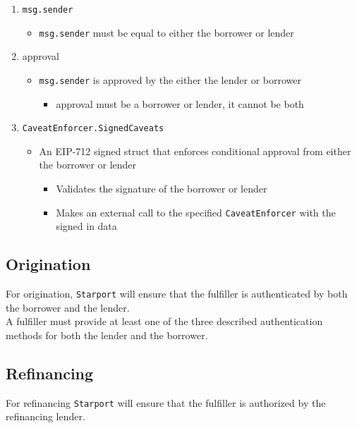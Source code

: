 \documentclass[12pt]{article}
\begin{document}
\begin{enumerate}
	\item\texttt{msg.sender}
		\begin{itemize}
			\item\texttt{msg.sender} must be equal to either the borrower or lender
		\end{itemize}
    	
	\item approval
		\begin{itemize}
    		\item\texttt{msg.sender} is approved by the either the lender or borrower
    			\begin{itemize}
        			\item approval must be a borrower or lender, it cannot be both
        		\end{itemize}
        \end{itemize}
	\item \texttt{CaveatEnforcer.SignedCaveats}
		\begin{itemize}
    		\item An EIP-712\cite{eip712} signed struct that enforces conditional approval from either the borrower or lender
    			\begin{itemize}
        			\item Validates the signature of the borrower or lender
        			\item Makes an external call to the specified \texttt{CaveatEnforcer} with the signed in data
        		\end{itemize}
        \end{itemize}
\end{enumerate}
\subsection{Origination}
For origination, \texttt{Starport} will ensure that the fulfiller is authenticated by both the borrower and the lender.\\

A fulfiller must provide at least one of the three described authentication methods for both the lender and the borrower.
\subsection{Refinancing}
For refinancing \texttt{Starport} will ensure that the fulfiller is authorized by the refinancing lender.\\
\end{document}
